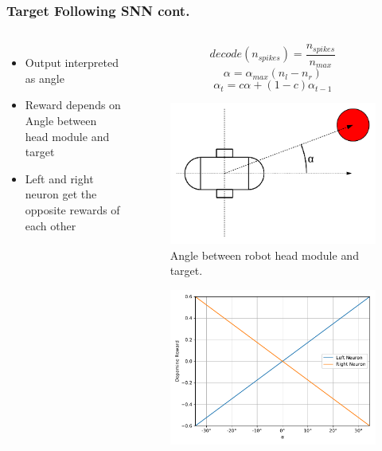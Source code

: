 \begin{frame}
	\frametitle{Target Following SNN cont.}
	\begin{columns}
			\begin{itemize}
				\item <1-> Output interpreted as angle
				\item <2-> Reward depends on Angle between head module and target
				\item <3-> Left and right neuron get the opposite rewards of each other
			\end{itemize}
			\begin{overprint}
				\[decode\left(n_{spikes}\right) = \frac{n_{spikes}}{n_{max}}\]
				\[\alpha = \alpha_{max} \left(n_l - n_r\right)\]
				\[\alpha_t = c \alpha + \left(1 - c\right) \alpha_{t-1}\]
				\onslide<2>
				\begin{figure}
					\centering
					\includegraphics[width=\textwidth]{img/angle.pdf}
					\caption{Angle between robot head module and target.}
					\label{fig:angle}
				\end{figure}
				\begin{figure}
					\centering
					\includegraphics[width=\textwidth]{img/angle_reward.pdf}

\end{figure}
\end{overprint}
\end{columns}
\end{frame}
